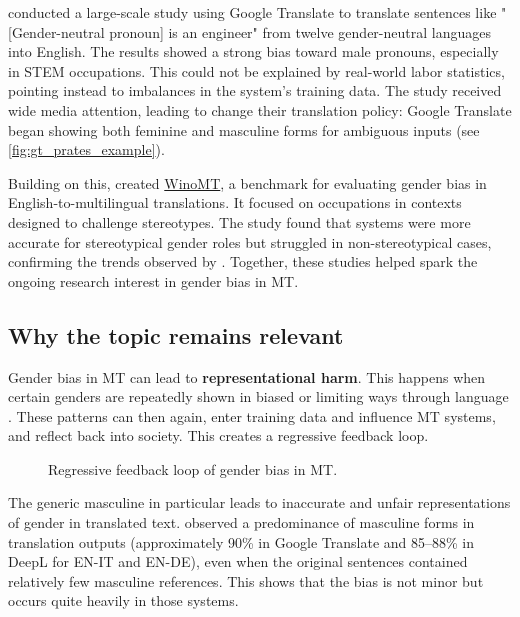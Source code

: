         \textbf{\citet{pratesAssessingGenderBias2019}} conducted a large-scale study using Google Translate to translate sentences like "[Gender-neutral pronoun] is an engineer" from twelve gender-neutral languages into English. The results showed a strong bias toward male pronouns, especially in STEM occupations. This could not be explained by real-world labor statistics, pointing instead to imbalances in the system's training data. The study received wide media attention, leading \citeauthor{googleReducingGenderBias2018} to change their translation policy: Google Translate began showing both feminine and masculine forms for ambiguous inputs \citep{googleReducingGenderBias2018} (see \autoref{fig:gt_prates_example}).

        Building on this, \textbf{\citet{stanovskyEvaluatingGenderBias2019}} created \href{https://github.com/gabrielStanovsky/mt_gender}{WinoMT}, a benchmark for evaluating gender bias in English-to-multilingual translations. It focused on occupations in contexts designed to challenge stereotypes. The study found that systems were more accurate for stereotypical gender roles but struggled in non-stereotypical cases, confirming the trends observed by \citeauthor{pratesAssessingGenderBias2019}.
        Together, these studies helped spark the ongoing research interest in gender bias in MT.

    \subsection{Why the topic remains relevant }
        Gender bias in MT can lead to \textbf{representational harm}. This happens when certain genders are repeatedly shown in biased or limiting ways through language \citep{stanczakSurveyGenderBias2021}. These patterns can then again, enter training data and influence MT systems, and reflect back into society. This creates a regressive feedback loop.

        \vspace{1cm} 
        \begin{figure}[htb]
            \centering
            \scalebox{0.8}{}
            \caption{Regressive feedback loop of gender bias in MT.}
            \label{fig:regressive_feedback_loop}
        \end{figure}
        \vspace{1cm} 

        The generic masculine in particular leads to inaccurate and unfair representations of gender in translated text. \citet{rescignoGenderBiasMachine2023} observed a predominance of masculine forms in translation outputs (approximately 90\% in Google Translate and 85–88\% in DeepL for EN-IT and EN-DE), even when the original sentences contained relatively few masculine references. This shows that the bias is not minor but occurs quite heavily in those systems.

